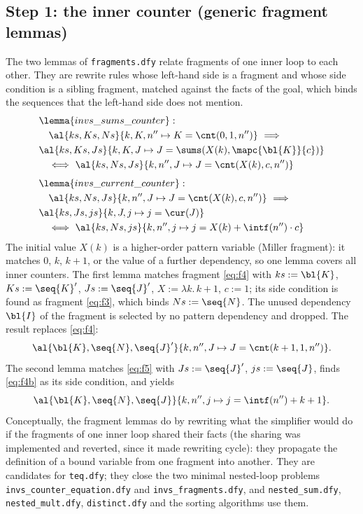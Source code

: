 \subsection{Step 1: the inner counter (generic fragment lemmas)}\label{sec:sel:frag}

The two lemmas of \texttt{fragments.dfy} relate fragments of one inner loop to each other. They are
rewrite rules whose left-hand side is a fragment and whose side condition is a sibling fragment, matched
against the facts of the goal, which binds the sequences that the left-hand side does not mention.
\begin{align*}
  &\lemma{invs\_sums\_counter}:\\
  &\quad \al{ks, Ks, Ns}{k, K, n'' \mapsto K = \cnt(0, 1, n'')}\ \Longrightarrow \\
  &\al{ks, Ks, Js}{k, K, J \mapsto J = \sums(X(k), \mapc{\bl{K}}{c})}\\
  &\quad\Longleftrightarrow\ \al{ks, Ns, Js}{k, n'', J \mapsto J = \cnt(X(k), c, n'')}\\[4pt]
  &\lemma{invs\_current\_counter}:\\
  &\quad \al{ks, Ns, Js}{k, n'', J \mapsto J = \cnt(X(k), c, n'')}\ \Longrightarrow \\
  &\al{ks, Js, js}{k, J, j \mapsto j = \cur(J)}\\
  &\quad\Longleftrightarrow\ \al{ks, Ns, js}{k, n'', j \mapsto j = X(k) + \intf(n'') \cdot c}
\end{align*}
The initial value $X(k)$ is a higher-order pattern variable (Miller fragment): it matches $0$, $k$,
$k + 1$, or the value of a further dependency, so one lemma covers all inner counters. The first lemma
matches fragment \eqref{eq:f4} with $ks := \bl{K}$, $Ks := \seq{K}'$, $Js := \seq{J}'$,
$X := \lambda k.\, k + 1$, $c := 1$; its side condition is found as fragment \eqref{eq:f3}, which binds
$Ns := \seq{N}$. The unused dependency $\bl{I}$ of the fragment is selected by no pattern dependency and
dropped. The result replaces \eqref{eq:f4}:
\begin{equation}
  \al{\bl{K}, \seq{N}, \seq{J}'}{k, n'', J \mapsto J = \cnt(k + 1, 1, n'')}. \label{eq:f4b}
\end{equation}
The second lemma matches \eqref{eq:f5} with $Js := \seq{J}'$, $js := \seq{J}$, finds \eqref{eq:f4b} as its
side condition, and yields
\begin{equation}
  \al{\bl{K}, \seq{N}, \seq{J}}{k, n'', j \mapsto j = \intf(n'') + k + 1}. \label{eq:f5b}
\end{equation}
Conceptually, the fragment lemmas do by rewriting what the simplifier would do if the fragments of one
inner loop shared their facts (the sharing was implemented and reverted, since it made rewriting cycle):
they propagate the definition of a bound variable from one fragment into another. They are candidates for
\texttt{teq.dfy}; they close the two minimal nested-loop problems \texttt{invs\_counter\_equation.dfy} and
\texttt{invs\_fragments.dfy}, and \texttt{nested\_sum.dfy}, \texttt{nested\_mult.dfy},
\texttt{distinct.dfy} and the sorting algorithms use them.

